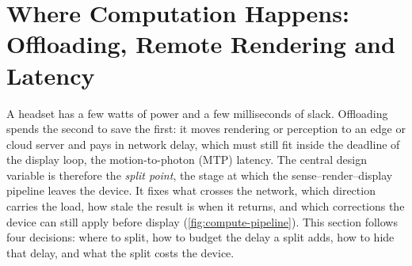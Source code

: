 \section{Where Computation Happens: Offloading, Remote Rendering and Latency}\label{sec:compute}

A headset has a few watts of power and a few milliseconds of slack. Offloading spends the second to
save the first: it moves rendering or perception to an edge or cloud server and pays in network delay,
which must still fit inside the deadline of the display loop, the motion-to-photon (MTP) latency. The
central design variable is therefore the \emph{split point}, the stage at which the sense--render--display pipeline
leaves the device. It fixes what crosses the network, which direction carries the load, how stale the
result is when it returns, and which corrections the device can still apply before display
(\cref{fig:compute-pipeline}). This section follows four decisions: where to split, how to budget the
delay a split adds, how to hide that delay, and what the split costs the device.

